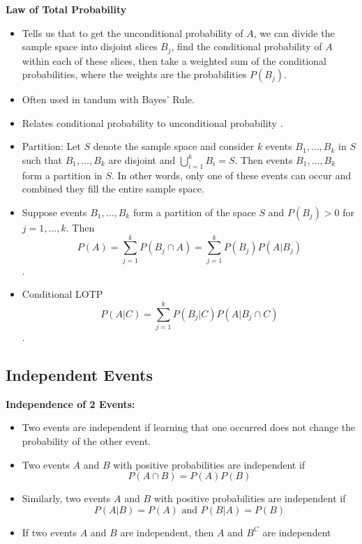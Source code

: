 \documentclass[11pt]{article}
\begin{document}
\textbf{Law of Total Probability}
\begin{itemize}
    \item Tells us that to get the unconditional probability of $A$, we can divide the sample
    space into disjoint slices $B_j$, find the conditional probability of $A$ within each of 
    these slices, then take a weighted sum of the conditional probabilities, where the weights
    are the probabilities $P(B_j)$.
    \item Often used in tandum with Bayes' Rule.
    \item Relates conditional probability to unconditional probability .
    \item Partition: Let $S$ denote the sample space and consider $k$ events $B_1, \ldots, B_k$
    in $S$ such that $B_1, \ldots, B_k$ are disjoint and $\bigcup_{i=1}^{k}B_i = S$. Then 
    events $B_1, \ldots, B_k$ form a partition in $S$. In other words, only one of these events
    can occur and combined they fill the entire sample space.
    \item Suppose events $B_1, \ldots, B_k$ form a partition of the space $S$ and $P(B_j) > 0$
    for $j = 1, \ldots, k$. Then \[P(A) = \sum_{j=1}^{k} P(B_j \cap A) = \sum_{j=1}^{k} P(B_j)
    P(A|B_j)\].
    \item Conditional LOTP \[P(A|C)= \sum_{j=1}^{k}P(B_j|C)P(A|B_j \cap C)\].
\end{itemize}

\subsection{Independent Events}

\textbf{Independence of 2 Events:}
\begin{itemize}
    \item Two events are independent if learning that one occurred does not change the
    probability of the other event.
    \item Two events $A$ and $B$ with positive probabilities are independent if 
    \[P(A \cap B) = P(A)P(B)\] 
    \item Similarly, two events $A$ and $B$ with positive probabilities are independent if 
    \[P(A|B) = P(A) \text{ and } P(B|A)=P(B)\]
    \item If two events $A$ and $B$ are independent, then $A$ and $B^C$ are independent
\end{itemize}
\end{document}
